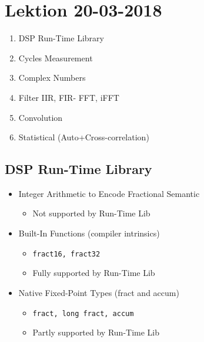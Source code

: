 \section{Lektion 20-03-2018}

\begin{enumerate}
	\item DSP Run-Time Library
	\item Cycles Measurement
	\item Complex Numbers
	\item Filter IIR, FIR- FFT, iFFT
	\item Convolution
	\item Statistical (Auto+Cross-correlation)
\end{enumerate}

\subsection{DSP Run-Time Library}
\begin{itemize}
	\item Integer Arithmetic to Encode Fractional Semantic
	\begin{itemize}
		\item Not supported by Run-Time Lib
	\end{itemize}
	\item  Built-In Functions (compiler intrinsics)
	\begin{itemize}
		\item \texttt{fract16, fract32}
		\item Fully supported by Run-Time Lib
	\end{itemize}
	\item Native Fixed-Point Types (fract and accum)
	\begin{itemize}
		\item \texttt{fract, long fract, accum}
		\item Partly supported by Run-Time Lib
	\end{itemize} 
\end{itemize}

